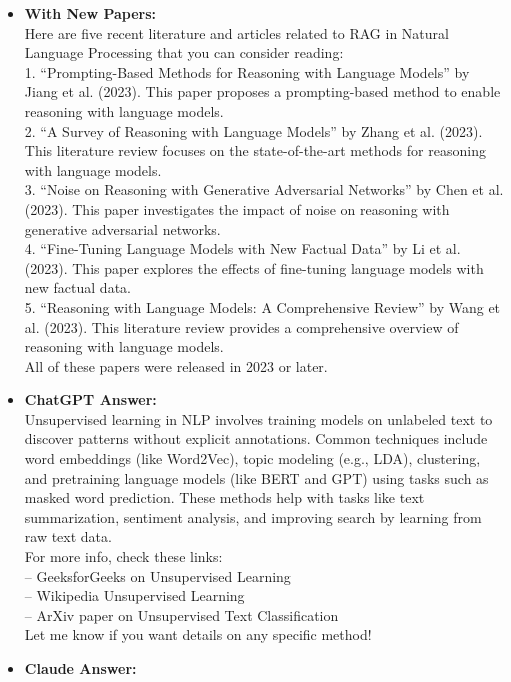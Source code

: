 \documentclass[fleqn,moreauthors,10pt]{ds_report}
\begin{document}
\begin{itemize}
  \item \textbf{With New Papers:} \\
  Here are five recent literature and articles related to RAG in Natural Language Processing that you can consider reading: \\[6pt]
  1. ``Prompting-Based Methods for Reasoning with Language Models'' by Jiang et al. (2023). This paper proposes a prompting-based method to enable reasoning with language models.\\
  2. ``A Survey of Reasoning with Language Models'' by Zhang et al. (2023). This literature review focuses on the state-of-the-art methods for reasoning with language models.\\
  3. ``Noise on Reasoning with Generative Adversarial Networks'' by Chen et al. (2023). This paper investigates the impact of noise on reasoning with generative adversarial networks.\\
  4. ``Fine-Tuning Language Models with New Factual Data'' by Li et al. (2023). This paper explores the effects of fine-tuning language models with new factual data.\\
  5. ``Reasoning with Language Models: A Comprehensive Review'' by Wang et al. (2023). This literature review provides a comprehensive overview of reasoning with language models.\\[6pt]
  All of these papers were released in 2023 or later.

  \item \textbf{ChatGPT Answer:} \\
  Unsupervised learning in NLP involves training models on unlabeled text to discover patterns without explicit annotations. Common techniques include word embeddings (like Word2Vec), topic modeling (e.g., LDA), clustering, and pretraining language models (like BERT and GPT) using tasks such as masked word prediction. These methods help with tasks like text summarization, sentiment analysis, and improving search by learning from raw text data.\\[6pt]
  For more info, check these links: \\
  -- GeeksforGeeks on Unsupervised Learning \\
  -- Wikipedia Unsupervised Learning \\
  -- ArXiv paper on Unsupervised Text Classification \\
  Let me know if you want details on any specific method!


  \item \textbf{Claude Answer:}


\end{itemize}
\end{document}
